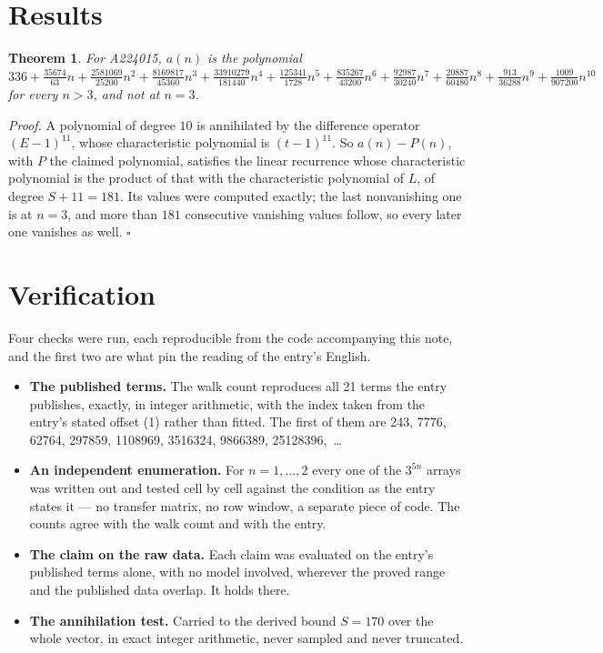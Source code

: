 \documentclass[11pt]{article}
\newtheorem{theorem}{Theorem}
\theoremstyle{definition}
\begin{document}
\section{Results}

\begin{theorem} For A224015, $a(n)$ is the polynomial $336 + \frac{35674}{63}n + \frac{2581069}{25200}n^{2} + \frac{8169817}{45360}n^{3} + \frac{33910279}{181440}n^{4} + \frac{125341}{1728}n^{5} + \frac{835267}{43200}n^{6} + \frac{92987}{30240}n^{7} + \frac{20887}{60480}n^{8} + \frac{913}{36288}n^{9} + \frac{1009}{907200}n^{10}$ for every $n > 3$, and not at $n = 3$.\end{theorem}

{\itshape Proof.} A polynomial of degree $10$ is annihilated by the difference operator $(E-1)^{11}$, whose characteristic polynomial is $(t-1)^{11}$. So $a(n) - P(n)$, with $P$ the claimed polynomial, satisfies the linear recurrence whose characteristic polynomial is the product of that with the characteristic polynomial of $L$, of degree $S + 11 = 181$. Its values were computed exactly; the last nonvanishing one is at $n = 3$, and more than $181$ consecutive vanishing values follow, so every later one vanishes as well. $\square$

\section{Verification}

Four checks were run, each reproducible from the code accompanying this note, and the first two are what pin the reading of the entry's English.

\begin{itemize}

\item {\bfseries The published terms.} The walk count reproduces all 21 terms the entry publishes, exactly, in integer arithmetic, with the index taken from the entry's stated offset (1) rather than fitted. The first of them are 243, 7776, 62764, 297859, 1108969, 3516324, 9866389, 25128396,~\dots

\item {\bfseries An independent enumeration.} For $n = 1,\dots,2$ every one of the $3^{5n}$ arrays was written out and tested cell by cell against the condition as the entry states it --- no transfer matrix, no row window, a separate piece of code. The counts agree with the walk count and with the entry.

\item {\bfseries The claim on the raw data.} Each claim was evaluated on the entry's published terms alone, with no model involved, wherever the proved range and the published data overlap. It holds there.

\item {\bfseries The annihilation test.} Carried to the derived bound $S = 170$ over the whole vector, in exact integer arithmetic, never sampled and never truncated.

\end{itemize}
\end{document}
